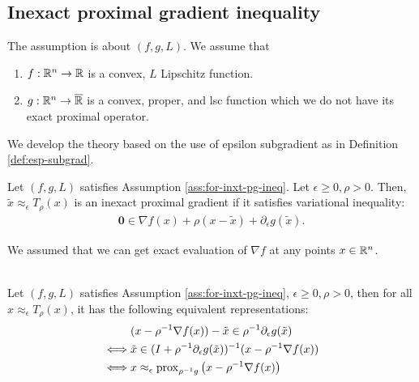 \documentclass[12pt]{article}
\begin{document}
    \subsection{Inexact proximal gradient inequality}
        \begin{assumption}\label{ass:for-inxt-pg-ineq}
            The assumption is about $(f, g, L)$. 
            We assume that 
            \begin{enumerate}[nosep]
                \item $f: \mathbb R^n \rightarrow \mathbb R$ is a convex, $L$ Lipschitz function. 
                \item $g: \mathbb R^n \rightarrow \overline{\mathbb R}$ is a convex, proper, and lsc function which we do not have its exact proximal operator. 
            \end{enumerate}
        \end{assumption}
        We develop the theory based on the use of epsilon subgradient as in Definition \ref{def:esp-subgrad}. 
        \begin{definition}\label{def:inxt-pg}
            Let $(f, g, L)$ satisfies Assumption \ref{ass:for-inxt-pg-ineq}. 
            Let $\epsilon \ge 0, \rho > 0$. 
            Then, $\tilde x \approx_\epsilon T_\rho(x)$ is an inexact proximal gradient if it satisfies variational inequality: 
            \begin{align*}
                \mathbf 0 \in \nabla f(x) + \rho(x - \tilde x) + \partial_{\epsilon} g(\tilde x). 
            \end{align*}
        \end{definition}
        \begin{remark}
            We assumed that we can get exact evaluation of $\nabla f$ at any points $x \in \mathbb R^n$. 
        \end{remark}
        \begin{lemma}\;\\
            Let $(f, g, L)$ satisfies Assumption \ref{ass:for-inxt-pg-ineq}, $\epsilon \ge 0, \rho > 0$, then for all $x \approx_\epsilon T_\rho(x)$, it has the following equivalent representations: 
            \begin{align*}
                & (x - \rho^{-1}\nabla f(x)) - \tilde x 
                \in \rho^{-1} \partial_\epsilon g(\tilde x)
                \\
                \iff 
                & \tilde x \in (I + \rho^{-1}\partial_\epsilon g(\tilde x))^{-1}
                (x - \rho^{-1}\nabla f(x))
                \\
                \iff 
                & x \approx_\epsilon \operatorname{prox}_{\rho^{-1} g}
                \left(x - \rho^{-1}\nabla f(x)\right)
            \end{align*}
        \end{lemma}
\end{document}
